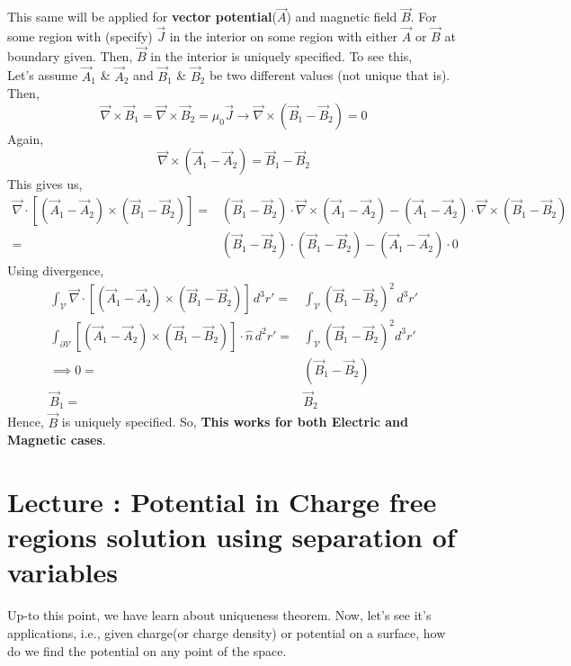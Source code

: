 \documentclass{article}
\newcommand{\lecture}[1]{
  \section{Lecture \thesection: #1}
}
\begin{document}
This same will be applied for \textbf{vector potential}($\vec{A}$) and magnetic field $\vec{B}$. For some region with (specify) $\vec{J}$ in the interior on some region with either $\vec{A}$ or $\vec{B}$ at boundary given. Then, $\vec{B}$ in the interior is uniquely specified. To see this,\\
Let's assume $\vec{A}_1$ \& $\vec{A}_2$ and $\vec{B}_1$ \& $\vec{B}_2$ be two different values (not unique that is). Then,
\begin{equation*}
    \vec{\nabla}\times \vec{B}_1 =  \vec{\nabla}\times \vec{B}_2 = \mu_0 \vec{J} \to \vec{\nabla}\times (\vec{B}_1 - \vec{B}_2) = 0
\end{equation*}
Again,
\begin{equation*}
    \vec{\nabla}\times (\vec{A}_1 - \vec{A}_2) = \vec{B}_1 - \vec{B}_2
\end{equation*}
This gives us,
\begin{equation*}
    \begin{split}
        \vec{\nabla}\cdot[(\vec{A}_1-\vec{A}_2)\times (\vec{B}_1-\vec{B}_2)] =& (\vec{B}_1-\vec{B}_2)\cdot \vec{\nabla}\times (\vec{A}_1-\vec{A}_2) - (\vec{A}_1-\vec{A}_2)\cdot \vec{\nabla}\times (\vec{B}_1-\vec{B}_2)\\
        =& (\vec{B}_1-\vec{B}_2)\cdot (\vec{B}_1-\vec{B}_2) - (\vec{A}_1-\vec{A}_2)\cdot 0
    \end{split}
\end{equation*}
Using divergence,
\begin{equation*}
    \begin{split}
        \int_{\mathcal{V}}\vec{\nabla}\cdot[(\vec{A}_1-\vec{A}_2)\times (\vec{B}_1-\vec{B}_2)]\, d^3r' =& \int_{\mathcal{V}}(\vec{B}_1-\vec{B}_2)^2\, d^3 r'\\
        \int_{\mathcal{\partial V}}[(\vec{A}_1-\vec{A}_2)\times (\vec{B}_1-\vec{B}_2)]\cdot \hat{n}\, d^2r' =& \int_{\mathcal{V}}(\vec{B}_1-\vec{B}_2)^2 d^3 r'\\
        \implies 0 =&  (\vec{B}_1-\vec{B}_2)\\
        \vec{B}_1 =& \vec{B}_2
    \end{split}
\end{equation*}
Hence, $\vec{B}$ is uniquely specified. So, \textbf{This works for both Electric and Magnetic cases}.
\lecture{Potential in Charge free regions solution using separation of variables}
Up-to this point, we have learn about uniqueness theorem. Now, let's see it's applications, i.e., given charge(or charge density) or potential on a surface, how do we find the potential on any point of the space.
\end{document}
